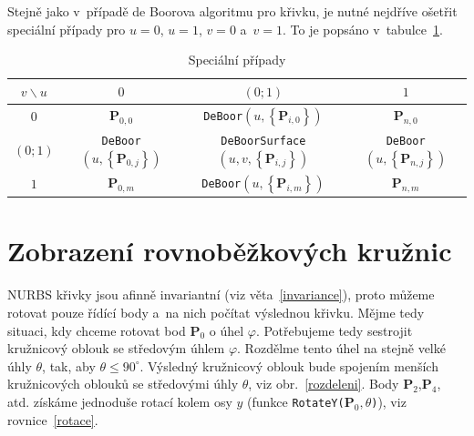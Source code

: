 \begin{poznamka}
	Stejně jako v~případě de Boorova algoritmu pro křivku, je nutné nejdříve ošetřit speciální případy pro $u=0$, $u=1$, $v=0$ a~$v=1$. To je popsáno v~tabulce~\ref{TabSpecPrip}.

	\begin{table}[!ht]
		\begin{center}
			\centering
			\renewcommand{\arraystretch}{1.3}
			\bigskip
			\caption{Speciální případy}
			\label{TabSpecPrip}
			\begin{tabular}{|c|ccc|}
				\hline
				$v\backslash{}u$ & $0$ & $\left(0;1\right)$ & $1$ \\ \hline
				$0$ & $\mathbf{P}_{0,0}$ & \texttt{DeBoor}$\left(u,\left\lbrace \mathbf{P}_{i,0} \right\rbrace \right)$ & $\mathbf{P}_{n,0}$   \\
				$\left(0;1\right)$ & \texttt{DeBoor}$\left(u,\left\lbrace \mathbf{P}_{0,j} \right\rbrace \right)$ & \texttt{DeBoorSurface}$\left(u,v,\left\lbrace \mathbf{P}_{i,j} \right\rbrace \right)$ & \texttt{DeBoor}$\left(u,\left\lbrace \mathbf{P}_{n,j} \right\rbrace \right)$ \\
				$1$ & $\mathbf{P}_{0,m}$   & \texttt{DeBoor}$\left(u,\left\lbrace \mathbf{P}_{i,m} \right\rbrace \right)$ & $\mathbf{P}_{n,m}$  \\ \hline
			\end{tabular}
		\end{center}
	\end{table}
\end{poznamka}
\pagebreak
\section{Zobrazení rovnoběžkových kružnic}

NURBS křivky jsou afinně invariantní (viz věta~\ref{invariance}), proto můžeme rotovat pouze řídící body a~na nich počítat výslednou křivku. Mějme tedy situaci, kdy chceme rotovat bod $\mathbf{P}_0$ o úhel $\varphi$. Potřebujeme tedy sestrojit kružnicový oblouk se středovým úhlem $\varphi$. Rozdělme tento úhel na stejně velké úhly $\theta$, tak, aby $\theta\leq90^{\circ}$. Výsledný kružnicový oblouk bude spojením menších kružnicových oblouků se středovými úhly $\theta$, viz obr.~\ref{rozdeleni}. Body $\mathbf{P}_2$,$\mathbf{P}_4$, atd. získáme jednoduše rotací kolem osy $y$ (funkce \texttt{RotateY($\mathbf{P}_0,\theta$)}), viz rovnice~\eqref{rotace}.

